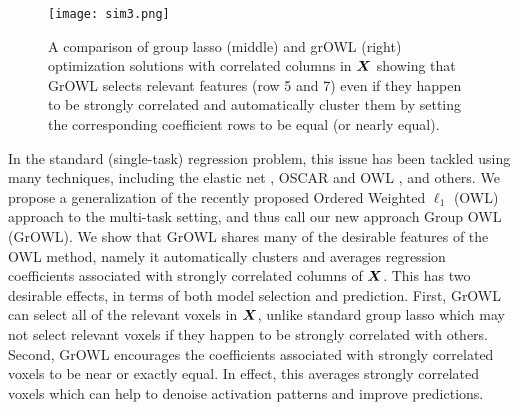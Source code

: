 \begin{figure}[!h]
  \centering
    \texttt{[image: sim3.png]}
    \qquad
    \caption{A comparison of group lasso (middle) and grOWL (right) optimization solutions with correlated columns in $\boldsymbol{X}$ showing that GrOWL selects relevant features (row 5 and 7) even if they happen to be strongly correlated and automatically cluster them by setting the corresponding coefficient rows to be equal (or nearly equal).}
    \label{Fig:sim}
\end{figure}

In the standard (single-task) regression problem, this issue has been tackled using many
techniques, including the elastic net \cite{EN}, OSCAR \cite{oscar} and OWL \cite{owl},
and others.  We propose a generalization of the recently proposed Ordered Weighted
$\ell_1$ (OWL) approach to the multi-task setting, and thus call our new approach Group
OWL (GrOWL).  We show that GrOWL shares many of the desirable features of the OWL method,
namely it automatically clusters and averages regression coefficients associated with
strongly correlated columns of $\boldsymbol{X}$.  This has two desirable effects, in terms of both
model selection and prediction.  First, GrOWL can select all of the relevant voxels in
$\boldsymbol{X}$, unlike standard group lasso which may not select relevant voxels if they happen to
be strongly correlated with others.  Second, GrOWL encourages the coefficients associated
with strongly correlated voxels to be near or exactly equal.   In effect, this averages
strongly correlated voxels which can help to denoise activation patterns and improve
predictions.
